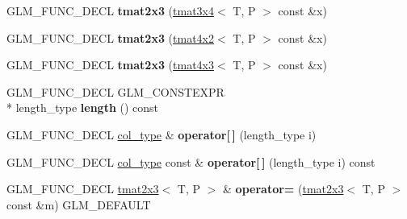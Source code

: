 \begin{DoxyCompactItemize}
\item 
\hypertarget{structglm_1_1tmat2x3_a19b9c117473f836b4c36961087ce2b91}{G\-L\-M\-\_\-\-F\-U\-N\-C\-\_\-\-D\-E\-C\-L {\bfseries tmat2x3} (\hyperlink{structglm_1_1tmat3x4}{tmat3x4}$<$ T, P $>$ const \&x)}\label{structglm_1_1tmat2x3_a19b9c117473f836b4c36961087ce2b91}

\item 
\hypertarget{structglm_1_1tmat2x3_a7481b6e2ed343bf249e483ccb856127a}{G\-L\-M\-\_\-\-F\-U\-N\-C\-\_\-\-D\-E\-C\-L {\bfseries tmat2x3} (\hyperlink{structglm_1_1tmat4x2}{tmat4x2}$<$ T, P $>$ const \&x)}\label{structglm_1_1tmat2x3_a7481b6e2ed343bf249e483ccb856127a}

\item 
\hypertarget{structglm_1_1tmat2x3_a1cd2447f8a0ce90be430d3406e3f951b}{G\-L\-M\-\_\-\-F\-U\-N\-C\-\_\-\-D\-E\-C\-L {\bfseries tmat2x3} (\hyperlink{structglm_1_1tmat4x3}{tmat4x3}$<$ T, P $>$ const \&x)}\label{structglm_1_1tmat2x3_a1cd2447f8a0ce90be430d3406e3f951b}

\item 
\hypertarget{structglm_1_1tmat2x3_a0176c0834f01110dcf79c5020ba8c609}{G\-L\-M\-\_\-\-F\-U\-N\-C\-\_\-\-D\-E\-C\-L G\-L\-M\-\_\-\-C\-O\-N\-S\-T\-E\-X\-P\-R \\*
length\-\_\-type {\bfseries length} () const }\label{structglm_1_1tmat2x3_a0176c0834f01110dcf79c5020ba8c609}

\item 
\hypertarget{structglm_1_1tmat2x3_a02f967c3523ed282c9dfa3b75e717bef}{G\-L\-M\-\_\-\-F\-U\-N\-C\-\_\-\-D\-E\-C\-L \hyperlink{structglm_1_1tvec3}{col\-\_\-type} \& {\bfseries operator\mbox{[}$\,$\mbox{]}} (length\-\_\-type i)}\label{structglm_1_1tmat2x3_a02f967c3523ed282c9dfa3b75e717bef}

\item 
\hypertarget{structglm_1_1tmat2x3_ab4991d1eff548787241acd1c2636cda9}{G\-L\-M\-\_\-\-F\-U\-N\-C\-\_\-\-D\-E\-C\-L \hyperlink{structglm_1_1tvec3}{col\-\_\-type} const \& {\bfseries operator\mbox{[}$\,$\mbox{]}} (length\-\_\-type i) const }\label{structglm_1_1tmat2x3_ab4991d1eff548787241acd1c2636cda9}

\item 
\hypertarget{structglm_1_1tmat2x3_a34adfda0aad499c5a23b3d1c80354429}{G\-L\-M\-\_\-\-F\-U\-N\-C\-\_\-\-D\-E\-C\-L \hyperlink{structglm_1_1tmat2x3}{tmat2x3}$<$ T, P $>$ \& {\bfseries operator=} (\hyperlink{structglm_1_1tmat2x3}{tmat2x3}$<$ T, P $>$ const \&m) G\-L\-M\-\_\-\-D\-E\-F\-A\-U\-L\-T}\label{structglm_1_1tmat2x3_a34adfda0aad499c5a23b3d1c80354429}


\end{DoxyCompactItemize}
